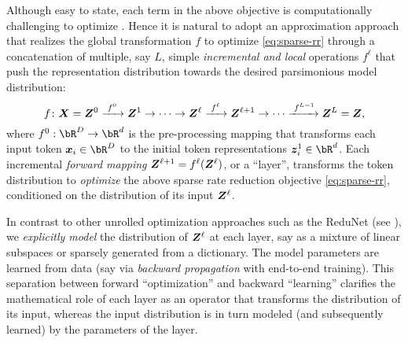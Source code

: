 \documentclass[\toplevelprefix/book-main.tex]{subfiles}
\begin{document}
Although easy to state, each term in the above objective is computationally challenging to optimize \cite{Wright-Ma-2022}. Hence it is natural to adopt an approximation approach that realizes the global transformation $f$ to optimize 
\eqref{eq:sparse-rr} through a concatenation of multiple, say $L$, simple \textit{incremental and local} operations $f^\ell$ that push the representation distribution towards the desired parsimonious model distribution:
\begin{equation}
f\colon \bm{X} = \bm Z^0 \xrightarrow{\hspace{1mm} f^0 \hspace{1mm}} \bm{Z}^1 \rightarrow \cdots \rightarrow \bm{Z}^\ell \xrightarrow{\hspace{1mm} f^{\ell} \hspace{1mm}} \bm{Z}^{\ell+1} \rightarrow  \cdots \xrightarrow{\hspace{1mm} f^{L-1}} \bm{Z}^L = \bm{Z},
\label{eq:incremental}
\end{equation}
where $f^0: \bR^{D} \rightarrow \bR^{d}$ is the pre-processing mapping that transforms each input token $\x_{i} \in \bR^{D}$ to the initial token representations $\z_{i}^{1} \in \bR^{d}$.  
Each incremental \textit{forward mapping} $\bm{Z}^{\ell + 1} = f^\ell(\bm{Z}^\ell)$, or a ``layer'', transforms the token distribution to \textit{optimize} the above sparse rate reduction objective \eqref{eq:sparse-rr}, conditioned on the distribution of its input $\bm{Z}^\ell$. 

\begin{remark}
    In contrast to other unrolled optimization approaches such as the ReduNet (see ), we \textit{explicitly model} the distribution of $\bm{Z}^\ell$ at each layer, say as a mixture of linear subspaces or sparsely generated from a dictionary. The model parameters are learned from data (say via \textit{backward propagation} with end-to-end training). This separation between forward ``optimization'' and backward
``learning'' clarifies the mathematical role of each layer as an operator
that transforms the distribution of its input, whereas the input distribution is in turn modeled (and subsequently learned) by the parameters of the layer. 
\end{remark}
\end{document}
